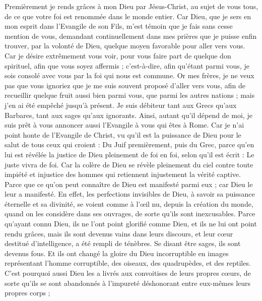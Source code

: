 \begin{multicols}{2}
Premièrement je rends grâces à mon Dieu par Jésus-Christ, au sujet de vous tous, de ce que votre foi est renommée dans le monde entier.
Car Dieu, que je sers en mon esprit dans l'Evangile de son Fils, m'est témoin que je fais sans cesse mention de vous,
demandant continuellement dans mes prières que je puisse enfin trouver, par la volonté de Dieu, quelque moyen favorable pour aller vers vous.
Car je désire extrêmement vous voir, pour vous faire part de quelque don spirituel, afin que vous soyez affermis ;
c'est-à-dire, afin qu'étant parmi vous, je sois consolé avec vous par la foi qui nous est commune.
Or mes frères, je ne veux pas que vous ignoriez que je me suis souvent proposé d'aller vers vous, afin de recueillir quelque fruit aussi bien parmi vous, que parmi les autres nations ; mais j'en ai été empêché jusqu'à présent.
Je suis débiteur tant aux Grecs qu'aux Barbares, tant aux sages qu'aux ignorants.
Ainsi, autant qu'il dépend de moi, je suis prêt à vous annoncer aussi l'Evangile à vous qui êtes à Rome.
Car je n'ai point honte de l'Evangile de Christ, vu qu'il est la puissance de Dieu pour le salut de tous ceux qui croient : Du Juif premièrement, puis du Grec,
parce qu'en lui est révélée la justice de Dieu pleinement de foi en foi, selon qu'il est écrit : Le juste vivra de foi.
Car la colère de Dieu se révèle pleinement du ciel contre toute impiété et injustice des hommes qui retiennent injustement la vérité captive.
Parce que ce qu'on peut connaître de Dieu est manifesté parmi eux ; car Dieu le leur a manifesté.
En effet, les perfections invisibles de Dieu, à savoir sa puissance éternelle et sa divinité, se voient comme à l'œil nu, depuis la création du monde, quand on les considère dans ses ouvrages, de sorte qu'ils sont inexcusables.
Parce qu'ayant connu Dieu, ils ne l'ont point glorifié comme Dieu, et ils ne lui ont point rendu grâces, mais ils sont devenus vains dans leurs discours, et leur cœur destitué d'intelligence, a été rempli de ténèbres.
Se disant être sages, ils sont devenus fous.
Et ils ont changé la gloire du Dieu incorruptible en images représentant l'homme corruptible, des oiseaux, des quadrupèdes, et des reptiles.
C'est pourquoi aussi Dieu les a livrés aux convoitises de leurs propres cœurs, de sorte qu'ils se sont abandonnés à l'impureté déshonorant entre eux-mêmes leurs propres corps ;

\end{multicols}
